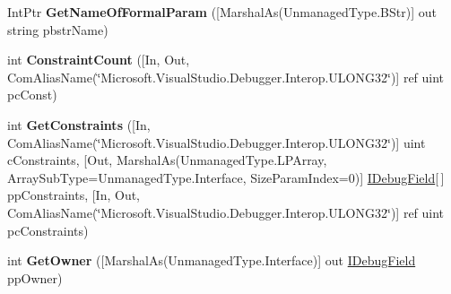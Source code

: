 \begin{DoxyCompactItemize}
\item 
\hypertarget{interface_microsoft_1_1_visual_studio_1_1_debugger_1_1_interop_e_e_1_1_i_debug_generic_param_field_a99b3c2a34b74072539fde59ca0f0d13b}{Int\+Ptr {\bfseries Get\+Name\+Of\+Formal\+Param} (\mbox{[}Marshal\+As(Unmanaged\+Type.\+B\+Str)\mbox{]} out string pbstr\+Name)}\label{interface_microsoft_1_1_visual_studio_1_1_debugger_1_1_interop_e_e_1_1_i_debug_generic_param_field_a99b3c2a34b74072539fde59ca0f0d13b}

\item 
\hypertarget{interface_microsoft_1_1_visual_studio_1_1_debugger_1_1_interop_e_e_1_1_i_debug_generic_param_field_aee8e0f1e8fc138d45596885b94249479}{int {\bfseries Constraint\+Count} (\mbox{[}In, Out, Com\+Alias\+Name(\char`\"{}Microsoft.\+Visual\+Studio.\+Debugger.\+Interop.\+U\+L\+O\+N\+G32\char`\"{})\mbox{]} ref uint pc\+Const)}\label{interface_microsoft_1_1_visual_studio_1_1_debugger_1_1_interop_e_e_1_1_i_debug_generic_param_field_aee8e0f1e8fc138d45596885b94249479}

\item 
\hypertarget{interface_microsoft_1_1_visual_studio_1_1_debugger_1_1_interop_e_e_1_1_i_debug_generic_param_field_a513e17de38bcfa4ce4c6be1f1efa385b}{int {\bfseries Get\+Constraints} (\mbox{[}In, Com\+Alias\+Name(\char`\"{}Microsoft.\+Visual\+Studio.\+Debugger.\+Interop.\+U\+L\+O\+N\+G32\char`\"{})\mbox{]} uint c\+Constraints, \mbox{[}Out, Marshal\+As(Unmanaged\+Type.\+L\+P\+Array, Array\+Sub\+Type=Unmanaged\+Type.\+Interface, Size\+Param\+Index=0)\mbox{]} \hyperlink{interface_microsoft_1_1_visual_studio_1_1_debugger_1_1_interop_e_e_1_1_i_debug_field}{I\+Debug\+Field}\mbox{[}$\,$\mbox{]} pp\+Constraints, \mbox{[}In, Out, Com\+Alias\+Name(\char`\"{}Microsoft.\+Visual\+Studio.\+Debugger.\+Interop.\+U\+L\+O\+N\+G32\char`\"{})\mbox{]} ref uint pc\+Constraints)}\label{interface_microsoft_1_1_visual_studio_1_1_debugger_1_1_interop_e_e_1_1_i_debug_generic_param_field_a513e17de38bcfa4ce4c6be1f1efa385b}

\item 
\hypertarget{interface_microsoft_1_1_visual_studio_1_1_debugger_1_1_interop_e_e_1_1_i_debug_generic_param_field_a15ba634afafa35ce3af3e4b2ce18c926}{int {\bfseries Get\+Owner} (\mbox{[}Marshal\+As(Unmanaged\+Type.\+Interface)\mbox{]} out \hyperlink{interface_microsoft_1_1_visual_studio_1_1_debugger_1_1_interop_e_e_1_1_i_debug_field}{I\+Debug\+Field} pp\+Owner)}\label{interface_microsoft_1_1_visual_studio_1_1_debugger_1_1_interop_e_e_1_1_i_debug_generic_param_field_a15ba634afafa35ce3af3e4b2ce18c926}


\end{DoxyCompactItemize}
